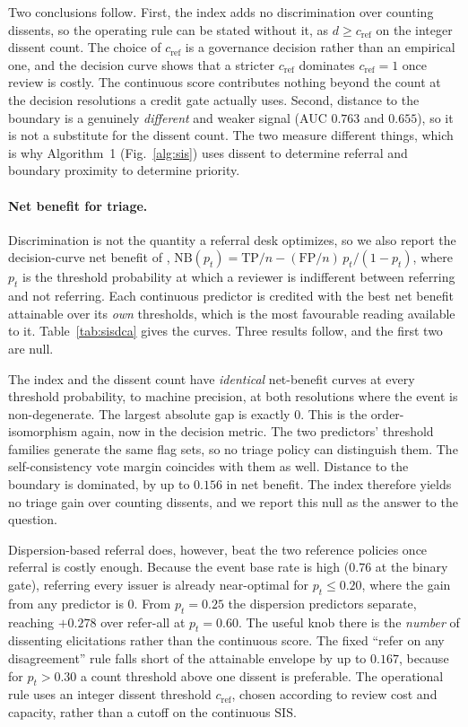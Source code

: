 \documentclass[a4paper,fleqn]{cas-sc}
\begin{document}
Two conclusions follow. First, the index adds no discrimination over counting dissents, so the
operating rule can be stated without it, as $d\ge c_{\mathrm{ref}}$ on the integer dissent count. The choice of $c_{\mathrm{ref}}$
is a governance decision rather than an empirical one, and the decision curve shows that a stricter $c_{\mathrm{ref}}$ dominates $c_{\mathrm{ref}}=1$ once review is costly.  The continuous score contributes
nothing beyond the count at the decision resolutions a credit gate actually uses. Second, distance
to the boundary is a genuinely \emph{different} and weaker signal (AUC $0.763$ and $0.655$), so it is
not a substitute for the dissent count. The two measure different things, which is why
Algorithm~1 (Fig.~\ref{alg:sis}) uses dissent to determine referral and boundary proximity to determine priority.

\paragraph{Net benefit for triage.}
Discrimination is not the quantity a referral desk optimizes, so we also report the decision-curve
net benefit of \citet{vickers2006dca},
$\mathrm{NB}(p_t)=\mathrm{TP}/n-(\mathrm{FP}/n)\,p_t/(1-p_t)$, where $p_t$ is the
threshold probability at which a reviewer is indifferent between referring and not referring. Each
continuous predictor is credited with the best net benefit attainable over its \emph{own}
thresholds, which is the most favourable reading available to it. Table~\ref{tab:sisdca} gives the
curves. Three results follow, and the first two are null.

The index and the dissent count have \emph{identical} net-benefit curves at every threshold
probability, to machine precision, at both resolutions where the event is non-degenerate. The
largest absolute gap is exactly $0$. This is the order-isomorphism again, now in the decision metric. The two predictors' threshold families generate the same flag sets, so no triage policy can
distinguish them. The self-consistency vote margin coincides with them as well. Distance to the
boundary is dominated, by up to $0.156$ in net benefit. The index therefore yields no triage gain
over counting dissents, and we report this null as the answer to the question.

Dispersion-based referral does, however, beat the two reference policies once referral is costly
enough. Because the event base rate is high ($0.76$ at the binary gate), referring every issuer is
already near-optimal for $p_t\le0.20$, where the gain from any predictor is $0$. From $p_t=0.25$ the
dispersion predictors separate, reaching $+0.278$ over refer-all at $p_t=0.60$. The useful knob there
is the \emph{number} of dissenting elicitations rather than the continuous score. The fixed ``refer on
any disagreement'' rule falls short of the attainable envelope by up to $0.167$, because for
$p_t>0.30$ a count threshold above one dissent is preferable. The operational rule uses an integer dissent threshold $c_{\mathrm{ref}}$, chosen according to review cost and capacity, rather than a cutoff on the continuous $\mathrm{SIS}$.
\end{document}
